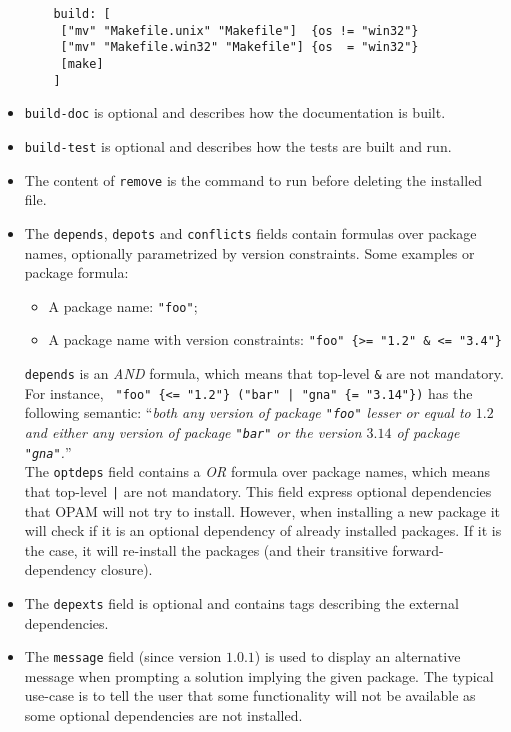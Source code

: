 \documentclass[a4paper,11pt]{article}
\begin{document}
\begin{itemize}
  \begin{Verbatim}
    build: [
     ["mv" "Makefile.unix" "Makefile"]  {os != "win32"}
     ["mv" "Makefile.win32" "Makefile"] {os  = "win32"}
     [make]
    ]
  \end{Verbatim}

\item {\tt build-doc} is optional and describes how the documentation
  is built.

\item {\tt build-test} is optional and describes how the tests are
  built and run.

\item The content of {\tt remove} is the command to run before deleting
  the installed file.

\item The {\tt depends}, {\tt depots} and {\tt conflicts} fields
  contain formulas over package names, optionally parametrized by
  version constraints. Some examples or package formula:

\begin{itemize}
\item A package name: {\tt "foo"};
\item A package name with version constraints:
  \verb+"foo" {>= "1.2" & <= "3.4"}+
\end{itemize}

{\tt depends} is an {\em AND} formula, which means that top-level
\verb+&+ are not mandatory. For instance,
 \verb+ "foo" {<= "1.2"} ("bar" | "gna" {= "3.14"})+ has the following
 semantic:  ``{\em both any version of package
  {\tt "foo"} lesser or equal to $1.2$ and either any version of package
  {\tt "bar"} or the version $3.14$ of package {\tt "gna"}.}''  \\

The {\tt optdeps} field contains a {\em OR} formula over
  package names, which means that top-level \verb+|+ are not
  mandatory. This field express optional dependencies that
  OPAM will not try to install. However, when installing a new
  package it will check if it is an optional dependency of already
  installed packages. If it is the case, it will re-install the
  packages (and their transitive forward-dependency closure).

\item The {\tt depexts} field is optional and contains tags describing
  the external dependencies.

\item The {\tt message} field (since version $1.0.1$) is used to
  display an alternative message when prompting a solution implying
  the given package. The typical use-case is to tell the user that
  some functionality will not be available as some optional
  dependencies are not installed.


\end{itemize}
\end{document}
